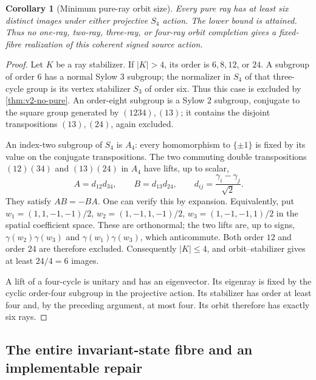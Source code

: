 \documentclass[11pt]{article}
\newtheorem{corollary}[corollary]{Corollary}
\theoremstyle{definition}
\theoremstyle{remark}
\begin{document}
\begin{corollary}[Minimum pure-ray orbit size]
\label{cor:v2-orbit-size}
Every pure ray has at least six distinct images under either projective
$S_4$ action. The lower bound is attained. Thus no one-ray, two-ray,
three-ray, or four-ray orbit completion gives a fixed-fibre realization of
this coherent signed source action.
\end{corollary}
\begin{proof}
Let $K$ be a ray stabilizer. If $|K|>4$, its order is $6,8,12$, or $24$.
A subgroup of order $6$ has a normal Sylow $3$ subgroup; the normalizer in
$S_4$ of that three-cycle group is its vertex stabilizer $S_3$ of order six.
Thus this case is excluded by \cref{thm:v2-no-pure}. An order-eight subgroup
is a Sylow $2$ subgroup, conjugate to the square group generated by
$(1234),(13)$; it contains the disjoint transpositions $(13),(24)$, again
excluded.

An index-two subgroup of $S_4$ is $A_4$: every homomorphism to $\{\pm1\}$
is fixed by its value on the conjugate transpositions. The two commuting
double transpositions $(12)(34)$ and $(13)(24)$ in $A_4$ have lifts,
up to scalar,
\[
 A=d_{12}d_{34},\qquad B=d_{13}d_{24},\qquad
 d_{ij}=\frac{\gamma_i-\gamma_j}{\sqrt2}.
\]
They satisfy $AB=-BA$. One can verify this by expansion. Equivalently, put
$w_1=(1,1,-1,-1)/2$, $w_2=(1,-1,1,-1)/2$,
$w_3=(1,-1,-1,1)/2$ in the spatial coefficient space. These are
orthonormal; the two lifts are, up to signs,
$\gamma(w_2)\gamma(w_3)$ and $\gamma(w_1)\gamma(w_3)$, which anticommute.
Both order $12$ and order $24$ are therefore excluded. Consequently
$|K|\le4$, and orbit--stabilizer gives at least $24/4=6$ images.

A lift of a four-cycle is unitary and has an eigenvector. Its eigenray is
fixed by the cyclic order-four subgroup in the projective action. Its
stabilizer has order at least four and, by the preceding argument, at most
four. Its orbit therefore has exactly six rays.
\end{proof}

\subsection{The entire invariant-state fibre and an implementable repair}
\end{document}
